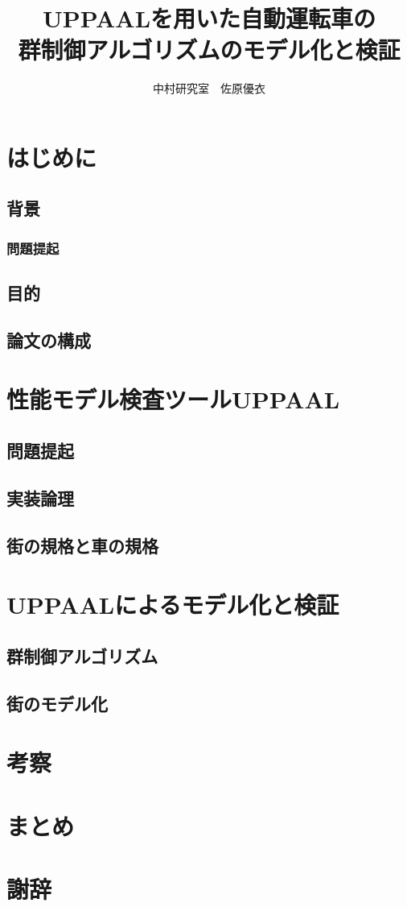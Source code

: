 \documentclass{jsreport}
\title{UPPAALを用いた自動運転車の\\群制御アルゴリズムのモデル化と検証}
\author{中村研究室　佐原優衣}
\begin{document}
\maketitle
\setcounter{tocdepth}{3}
\tableofcontents
\clearpage
\chapter{はじめに}
	\section{背景}
		\subsection{問題提起}
	\section{目的}
	\section{論文の構成}
\chapter{性能モデル検査ツールUPPAAL}
	\section{問題提起}
	\section{実装論理}
	\section{街の規格と車の規格}
\chapter{UPPAALによるモデル化と検証}
	\section{群制御アルゴリズム}
	\section{街のモデル化}
\chapter{考察}
\chapter{まとめ}
\chapter*{謝辞}
\end{document}
